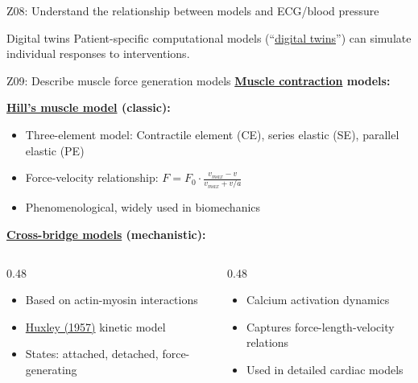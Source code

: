 \documentclass[aspectratio=169, 10pt]{beamer}
\begin{document}
\begin{frame}{Z08: Understand the relationship between models and ECG/blood pressure}
    \vspace{0.2cm}
    \begin{block}{Digital twins}
        Patient-specific computational models (``\href{https://en.wikipedia.org/wiki/Digital_twin}{digital twins}'') can simulate individual responses to interventions.
    \end{block}
\end{frame}

\begin{frame}{Z09: Describe muscle force generation models}
    \textbf{\href{https://en.wikipedia.org/wiki/Muscle_contraction}{Muscle contraction} models:}
    
    \vspace{0.2cm}
    \textbf{\href{https://en.wikipedia.org/wiki/Hill\%27s_muscle_model}{Hill's muscle model} (classic):}
    \begin{itemize}
        \item Three-element model: Contractile element (CE), series elastic (SE), parallel elastic (PE)
        \item Force-velocity relationship: $F = F_0 \cdot \frac{v_{max} - v}{v_{max} + v/a}$
        \item Phenomenological, widely used in biomechanics
    \end{itemize}
    
    \vspace{0.2cm}
    \textbf{\href{https://en.wikipedia.org/wiki/Sliding_filament_theory}{Cross-bridge models} (mechanistic):}
    \begin{columns}[T]
        \begin{column}{0.48\textwidth}
            \begin{itemize}
                \item Based on actin-myosin interactions
                \item \href{https://www.ncbi.nlm.nih.gov/pmc/articles/PMC1366732/}{Huxley (1957)} kinetic model
                \item States: attached, detached, force-generating
            \end{itemize}
        \end{column}
        \begin{column}{0.48\textwidth}
            \begin{itemize}
                \item Calcium activation dynamics
                \item Captures force-length-velocity relations
                \item Used in detailed cardiac models
            \end{itemize}
        \end{column}
    \end{columns}
    

\end{frame}
\end{document}
